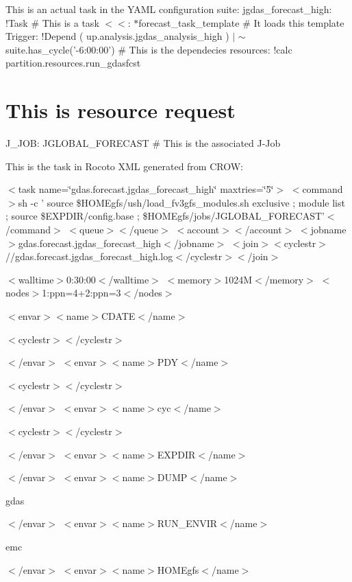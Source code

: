 This is an actual task in the Y\-A\-M\-L configuration suite\-: jgdas\-\_\-forecast\-\_\-high\-: !\-Task \# This is a task $<$$<$\-: $\ast$forecast\-\_\-task\-\_\-template \# It loads this template Trigger\-: !\-Depend ( up.\-analysis.\-jgdas\-\_\-analysis\-\_\-high ) $|$ $\sim$ suite.\-has\-\_\-cycle('-\/6\-:00\-:00') \# This is the dependecies resources\-: !calc partition.\-resources.\-run\-\_\-gdasfcst \section*{This is resource request}

J\-\_\-\-J\-O\-B\-: J\-G\-L\-O\-B\-A\-L\-\_\-\-F\-O\-R\-E\-C\-A\-S\-T \# This is the associated J-\/\-Job

This is the task in Rocoto X\-M\-L generated from C\-R\-O\-W\-:

$<$task name=\char`\"{}gdas.\-forecast.\-jgdas\-\_\-forecast\-\_\-high\char`\"{} maxtries=\char`\"{}5\char`\"{}$>$ $<$command$>$sh -\/c ' source \$\-H\-O\-M\-Egfs/ush/load\-\_\-fv3gfs\-\_\-modules.sh exclusive ; module list ; source \$\-E\-X\-P\-D\-I\-R/config.base ; \$\-H\-O\-M\-Egfs/jobs/\-J\-G\-L\-O\-B\-A\-L\-\_\-\-F\-O\-R\-E\-C\-A\-S\-T'$<$/command$>$ $<$queue$>$$<$/queue$>$ $<$account$>$$<$/account$>$ $<$jobname$>$gdas.\-forecast.\-jgdas\-\_\-forecast\-\_\-high$<$/jobname$>$ $<$join$>$$<$cyclestr$>$//gdas.forecast.\-jgdas\-\_\-forecast\-\_\-high.\-log$<$/cyclestr$>$$<$/join$>$

$<$walltime$>$0\-:30\-:00$<$/walltime$>$ $<$memory$>$1024\-M$<$/memory$>$ $<$nodes$>$1\-:ppn=4+2\-:ppn=3$<$/nodes$>$

$<$envar$>$$<$name$>$C\-D\-A\-T\-E$<$/name$>$

$<$cyclestr$>$$<$/cyclestr$>$

$<$/envar$>$ $<$envar$>$$<$name$>$P\-D\-Y$<$/name$>$

$<$cyclestr$>$$<$/cyclestr$>$

$<$/envar$>$ $<$envar$>$$<$name$>$cyc$<$/name$>$

$<$cyclestr$>$$<$/cyclestr$>$

$<$/envar$>$ $<$envar$>$$<$name$>$E\-X\-P\-D\-I\-R$<$/name$>$

$<$/envar$>$ $<$envar$>$$<$name$>$D\-U\-M\-P$<$/name$>$

gdas

$<$/envar$>$ $<$envar$>$$<$name$>$R\-U\-N\-\_\-\-E\-N\-V\-I\-R$<$/name$>$

emc

$<$/envar$>$ $<$envar$>$$<$name$>$H\-O\-M\-Egfs$<$/name$>$

